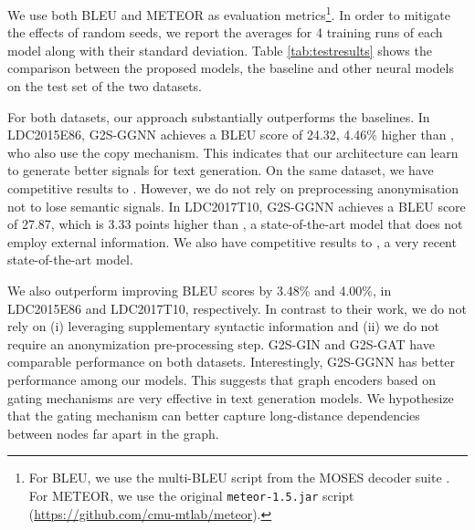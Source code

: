 \documentclass[11pt,a4paper]{article}
\begin{document}
 We use both BLEU \cite{Papineni:2002:BMA:1073083.1073135} and METEOR \cite{Denkowski14meteoruniversal} as evaluation metrics\footnote{For BLEU, we use the multi-BLEU script from the MOSES decoder suite \cite{Koehn:2007:MOS:1557769.1557821}. For METEOR, we use the original \texttt{meteor-1.5.jar} script (\href{https://github.com/cmu-mtlab/meteor}{https://github.com/cmu-mtlab/meteor}).}. In order to mitigate the effects of random seeds, we report the averages for 4 training runs of each model along with their standard deviation. Table \ref{tab:testresults} shows the comparison between the proposed models, the baseline and other neural models on the test set of the two datasets. 

For both datasets, our approach substantially outperforms the baselines. In LDC2015E86, {\selectfont G2S-GGNN} achieves a BLEU score of 24.32,  4.46\% higher than \citet{song-etal-acl2018}, who also use the copy mechanism. This indicates that our architecture can learn to generate better signals for text generation. On the same dataset, we have competitive results to \citet{damonte_naacl18}. However, we do not rely on preprocessing anonymisation not to lose semantic signals. In LDC2017T10, {\selectfont G2S-GGNN} achieves a BLEU score of 27.87, which is 3.33 points higher than \citet{damonte_naacl18}, a state-of-the-art model that does not employ external information. We also have competitive results to \citet{dcgcnforgraph2seq19guo}, a very recent state-of-the-art model.


We also outperform \citet{cao_naacl19} improving BLEU scores by 3.48\% and 4.00\%, in LDC2015E86 and LDC2017T10, respectively. In contrast to their work, we do not rely on (i) leveraging supplementary syntactic information and (ii) we do not require an anonymization pre-processing step. {\selectfont G2S-GIN} and {\selectfont G2S-GAT} have comparable performance on both datasets. Interestingly, {\selectfont G2S-GGNN} has better performance among our models. This suggests that graph encoders based on gating mechanisms are very effective in text generation models. We hypothesize that the gating mechanism can better capture long-distance dependencies between nodes far apart in the graph. 
\end{document}
